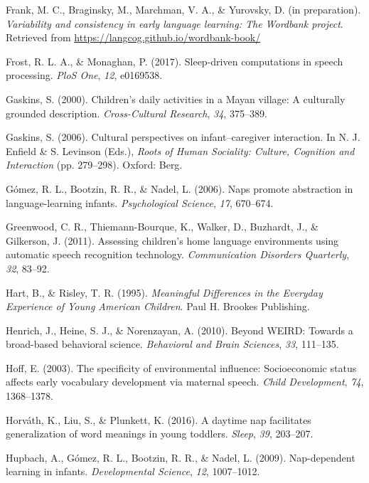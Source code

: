 \documentclass[floatsintext,man]{apa6}
\theoremstyle{definition}
\theoremstyle{definition}
\theoremstyle{definition}
\theoremstyle{remark}
\begin{document}
\hypertarget{ref-frankIPvariability}{}
Frank, M. C., Braginsky, M., Marchman, V. A., \& Yurovsky, D. (in
preparation). \emph{Variability and consistency in early language
learning: The Wordbank project}. Retrieved from
\url{https://langcog.github.io/wordbank-book/}

\hypertarget{ref-frost2017sleep}{}
Frost, R. L. A., \& Monaghan, P. (2017). Sleep-driven computations in
speech processing. \emph{PloS One}, \emph{12}, e0169538.

\hypertarget{ref-gaskins2000childrens}{}
Gaskins, S. (2000). Children's daily activities in a Mayan village: A
culturally grounded description. \emph{Cross-Cultural Research},
\emph{34}, 375--389.

\hypertarget{ref-gaskins2006cultural}{}
Gaskins, S. (2006). Cultural perspectives on infant--caregiver
interaction. In N. J. Enfield \& S. Levinson (Eds.), \emph{Roots of
Human Sociality: Culture, Cognition and Interaction} (pp. 279--298).
Oxford: Berg.

\hypertarget{ref-gomez2006naps}{}
Gómez, R. L., Bootzin, R. R., \& Nadel, L. (2006). Naps promote
abstraction in language-learning infants. \emph{Psychological Science},
\emph{17}, 670--674.

\hypertarget{ref-greenwood2011assessing}{}
Greenwood, C. R., Thiemann-Bourque, K., Walker, D., Buzhardt, J., \&
Gilkerson, J. (2011). Assessing children's home language environments
using automatic speech recognition technology. \emph{Communication
Disorders Quarterly}, \emph{32}, 83--92.

\hypertarget{ref-hart1995meaningful}{}
Hart, B., \& Risley, T. R. (1995). \emph{Meaningful Differences in the
Everyday Experience of Young American Children}. Paul H. Brookes
Publishing.

\hypertarget{ref-henrich2010beyond}{}
Henrich, J., Heine, S. J., \& Norenzayan, A. (2010). Beyond WEIRD:
Towards a broad-based behavioral science. \emph{Behavioral and Brain
Sciences}, \emph{33}, 111--135.

\hypertarget{ref-hoff2003specificity}{}
Hoff, E. (2003). The specificity of environmental influence:
Socioeconomic status affects early vocabulary development via maternal
speech. \emph{Child Development}, \emph{74}, 1368--1378.

\hypertarget{ref-horvath2016daytime}{}
Horváth, K., Liu, S., \& Plunkett, K. (2016). A daytime nap facilitates
generalization of word meanings in young toddlers. \emph{Sleep},
\emph{39}, 203--207.

\hypertarget{ref-hupbach2009nap}{}
Hupbach, A., Gómez, R. L., Bootzin, R. R., \& Nadel, L. (2009).
Nap-dependent learning in infants. \emph{Developmental Science},
\emph{12}, 1007--1012.
\end{document}
